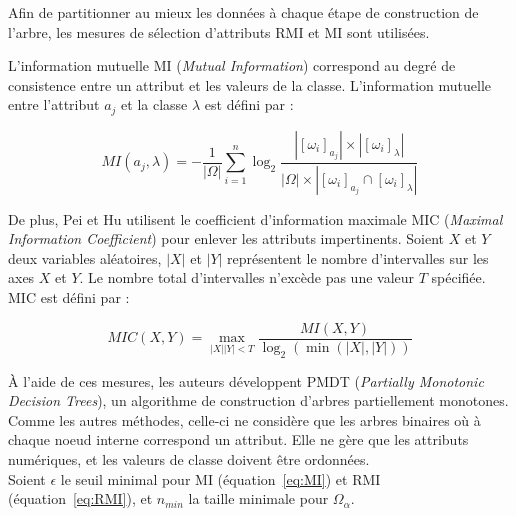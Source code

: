 \documentclass[a4paper]{article}
\renewcommand{\eqref}[1]{équation~\ref{#1}}
\begin{document}
Afin de partitionner au mieux les données à chaque étape de construction de
l'arbre, les mesures de sélection d'attributs RMI et MI sont utilisées. 

\noindent L'information mutuelle MI (\emph{Mutual Information}) correspond au degré de
consistence entre un attribut et les valeurs de la classe. L'information
mutuelle entre l'attribut $a_j$ et la classe $\lambda$ est défini par :

\begin{equation}
    MI(a_j, \lambda) = -\frac{1}{|\Omega|} \sum_{i=1}^{n} \log_{2}
    \frac{|[\omega_i]_{a_j}|
    \times |[\omega_i]_{\lambda}|}{|\Omega| \times |[\omega_i]_{a_j} \cap
    [\omega_i]_{\lambda}|}
\label{eq:MI}
\end{equation}

\noindent De plus, Pei et Hu \cite{pei-partially} utilisent le coefficient
d'information maximale MIC (\emph{Maximal Information Coefficient}) pour enlever
les attributs impertinents. Soient $X$ et $Y$ deux variables aléatoires, $|X|$
et $|Y|$ représentent le nombre d'intervalles sur les axes $X$ et $Y$. Le nombre
total d'intervalles n'excède pas une valeur $T$ spécifiée. MIC est défini par :

\begin{equation}
    MIC(X, Y) = \max_{|X||Y| < T} \frac{MI(X,Y)}{\log_{2}(\min(|X|,|Y|))}
\label{eq:MIC}
\end{equation}

À l'aide de ces mesures, les auteurs développent PMDT (\emph{Partially
Monotonic Decision Trees}), un algorithme de construction d'arbres partiellement
monotones. Comme les autres méthodes, celle-ci ne considère que les arbres
binaires où à chaque noeud interne correspond un attribut. Elle ne gère que les
attributs numériques, et les valeurs de classe doivent être ordonnées. \\

Soient $\epsilon$ le seuil minimal pour MI (\eqref{eq:MI}) et RMI
(\eqref{eq:RMI}), et $n_{min}$ la taille minimale pour $\Omega_{\alpha}$.
\end{document}
